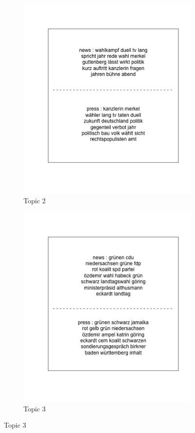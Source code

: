 \documentclass[12pt,a4paper,notitlepage]{article}
\begin{document}
\begin{figure}[H]
\begin{center}
\begin{subfigure}[normla]{0.3\textwidth}
			\includegraphics[width=\textwidth]{../figs/topiclabel/topic_label2}
			\caption{Topic 2}
		\end{subfigure}
		\begin{subfigure}[normla]{0.3\textwidth}
			\includegraphics[width=\textwidth]{../figs/topiclabel/topic_label3}
			\caption{Topic 3}
		\end{subfigure}
	\end{center}
\end{figure}
\end{document}
